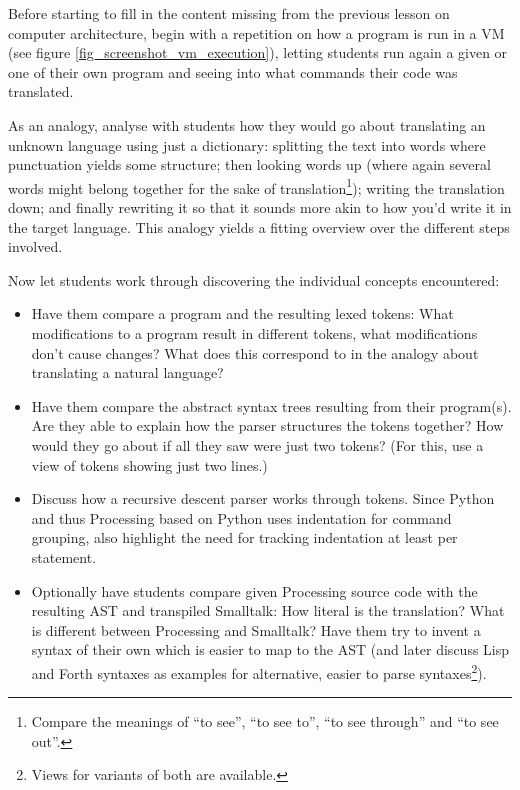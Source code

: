 \begin{instructions}
\item Before starting to fill in the content missing from the previous lesson on computer architecture, begin with a repetition on how a program is run in a \ac{VM} (see figure \ref{fig_screenshot_vm_execution}), letting students run again a given or one of their own program and seeing into what commands their code was translated.
\item As an analogy, analyse with students how they would go about translating an unknown language using just a dictionary: splitting the text into words where punctuation yields some structure; then looking words up (where again several words might belong together for the sake of translation\footnote{Compare \eg the meanings of ``to see'', ``to see to'', ``to see through'' and ``to see out''.}); writing the translation down; and finally rewriting it so that it sounds more akin to how you'd write it in the target language. This analogy yields a fitting overview over the different steps involved.
\item Now let students work through discovering the individual concepts encountered:
\begin{itemize}
\item Have them compare a program and the resulting lexed tokens: What modifications to a program result in different tokens, what modifications don't cause changes? What does this correspond to in the analogy about translating a natural language?
\item Have them compare the abstract syntax trees resulting from their program(s). Are they able to explain how the parser structures the tokens together? How would they go about if all they saw were just two tokens? (For this, use a view of tokens showing just two lines.)
\item Discuss how a recursive descent parser works through tokens. Since Python and thus Processing based on Python uses indentation for command grouping, also highlight the need for tracking indentation at least per statement.
\item Optionally have students compare given Processing source code with the resulting \ac{AST} and transpiled Smalltalk: How literal is the translation? What is different between Processing and Smalltalk? Have them try to invent a syntax of their own which is easier to map to the \ac{AST} (and later discuss Lisp and Forth syntaxes as examples for alternative, easier to parse syntaxes\footnote{Views for variants of both are available.}).

\end{itemize}
\end{instructions}
